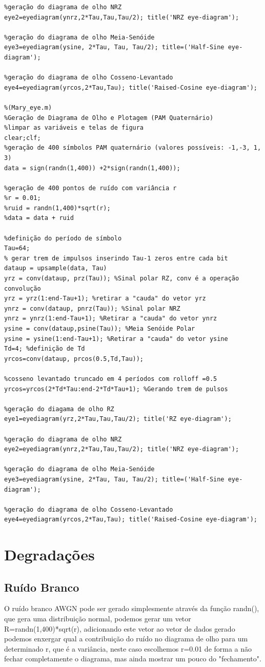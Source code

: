 \begin{verbatim}
%geração do diagrama de olho NRZ
eye2=eyediagram(ynrz,2*Tau,Tau,Tau/2); title('NRZ eye-diagram'); 

%geração do diagrama de olho Meia-Senóide
eye3=eyediagram(ysine, 2*Tau, Tau, Tau/2); title=('Half-Sine eye-diagram'); 

%geração do diagrama de olho Cosseno-Levantado
eye4=eyediagram(yrcos,2*Tau,Tau); title('Raised-Cosine eye-diagram');

%(Mary_eye.m)
%Geração de Diagrama de Olho e Plotagem (PAM Quaternário)
%limpar as variáveis e telas de figura
clear;clf;
%geração de 400 símbolos PAM quaternário (valores possíveis: -1,-3, 1, 3) 
data = sign(randn(1,400)) +2*sign(randn(1,400));

%geração de 400 pontos de ruído com variância r
%r = 0.01;
%ruid = randn(1,400)*sqrt(r);
%data = data + ruid

%definição do período de símbolo
Tau=64;
% gerar trem de impulsos inserindo Tau-1 zeros entre cada bit
dataup = upsample(data, Tau) 
yrz = conv(dataup, prz(Tau)); %Sinal polar RZ, conv é a operação convolução
yrz = yrz(1:end-Tau+1); %retirar a "cauda" do vetor yrz
ynrz = conv(dataup, pnrz(Tau)); %Sinal polar NRZ
ynrz = ynrz(1:end-Tau+1); %Retirar a "cauda" do vetor ynrz
ysine = conv(dataup,psine(Tau)); %Meia Senóide Polar
ysine = ysine(1:end-Tau+1); %Retirar a "cauda" do vetor ysine
Td=4; %definição de Td
yrcos=conv(dataup, prcos(0.5,Td,Tau)); 

%cosseno levantado truncado em 4 períodos com rolloff =0.5
yrcos=yrcos(2*Td*Tau:end-2*Td*Tau+1); %Gerando trem de pulsos

%geração do diagama de olho RZ
eye1=eyediagram(yrz,2*Tau,Tau,Tau/2); title('RZ eye-diagram'); 

%geração do diagrama de olho NRZ
eye2=eyediagram(ynrz,2*Tau,Tau,Tau/2); title('NRZ eye-diagram'); 

%geração do diagrama de olho Meia-Senóide
eye3=eyediagram(ysine, 2*Tau, Tau, Tau/2); title=('Half-Sine eye-diagram'); 

%geração do diagrama de olho Cosseno-Levantado
eye4=eyediagram(yrcos,2*Tau,Tau); title('Raised-Cosine eye-diagram');

\end{verbatim}

\section{Degradações}
\subsection{Ruído Branco}
O ruído branco AWGN pode ser gerado simplesmente através da função randn(), que gera uma distribuição normal, podemos gerar um vetor R=randn(1,400)*sqrt(r), adicionando este vetor ao vetor de dados gerado podemos enxergar qual a contribuição do ruído no diagrama de olho para um determinado r, que é a variância, neste caso escolhemos r=0.01 de forma a não fechar completamente o diagrama, mas ainda mostrar um pouco do "fechamento".
